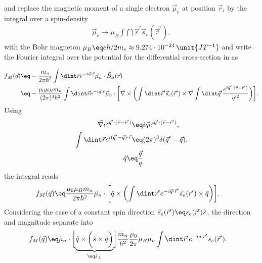 \documentclass[\main/dresen_thesis.tex]{subfiles}
\begin{document}
and replace the magnetic moment of a single electron $\vec{\mu}_e$ at position $\vec{r}_i$ by the integral over a spin-density
\begin{align}
  \vec{\mu}_e \rightarrow \mu_B \int \dint \vec{r}^\prime \vec{s}_e(\vec{r}^\prime),
\end{align}
with the Bohr magneton $\mu_B \eq e\hbar / 2 m_e \approx 9.274 \cdot 10^{-24} \, \unit{JT^{-1}}$ and write the Fourier integral over the potential for the differential cross-section in  as

\begin{align}
  f_M (\vec{q}) \eq &- \frac{m_n}{2\pi \hbar^2} \int \dint \vec{r} e^{-i\vec{q} \cdot \vec{r}}\vec{\mu}_n \cdot \vec{B}_S (\vec{r})\\
  \eq &- \frac{\mu_0 \mu_B m_n}{(2\pi)^4 \hbar^2}  \int \dint \vec{r} e^{-i\vec{q} \cdot \vec{r}}\vec{\mu}_n \cdot \biggl[ \vec{\nabla} \times \biggl(\int \dint \vec{r}^\prime \vec{s}_e(\vec{r}^\prime) \times \vec{\nabla} \int \dint \vec{q}^\prime \frac{e^{i \vec{q}^\prime \cdot (\vec{r} - \vec{r}^\prime)}}{q^{\prime 2}} \biggr) \biggr].
\end{align}
Using
\begin{align}
  \vec{\nabla}e^{i \vec{q}^\prime \cdot (\vec{r} - \vec{r}^\prime)} \eq& i \vec{q} e^{i \vec{q}^\prime \cdot (\vec{r} - \vec{r}^\prime)},\\
  \int \dint \vec{r} e^{i(\vec{q}^\prime - \vec{q}) \cdot \vec{r}} \eq& (2 \pi)^3 \delta(\vec{q}^\prime - \vec{q}),\\
  \hat{q} \eq \frac{\vec{q}}{q}
\end{align}
the integral reads
\begin{align}
  f_M (\vec{q}) \eq & \frac{\mu_0 \mu_B m_n}{2 \pi \hbar^2} \vec{\mu}_n \cdot \biggl[ \hat{q} \times \biggl( \int \dint \vec{r}^\prime e^{- i \vec{q} \cdot \vec{r}^\prime} \vec{s}_e(\vec{r}^\prime) \times \hat{q}\biggr) \biggr].
\end{align}
Considering the case of a constant spin direction $\vec{s}_e (\vec{r}^\prime) \eq s_e (\vec{r}^\prime) \hat{s}$, the direction and magnitude separate into
\begin{align}
  f_M (\vec{q}) \eq & \hat{\mu}_n \cdot \biggl[ \underbrace{ \hat{q} \times \biggl( \hat{s} \times \hat{q}\biggr) }_{\eq \hat{s}_\perp}\biggr] \frac{m_n}{\hbar^2}  \frac{\mu_0}{2\pi} \mu_B \mu_n   \int \dint \vec{r}^\prime e^{- i \vec{q} \cdot \vec{r}^\prime} s_e(\vec{r}^\prime).
\end{align}
\end{document}
